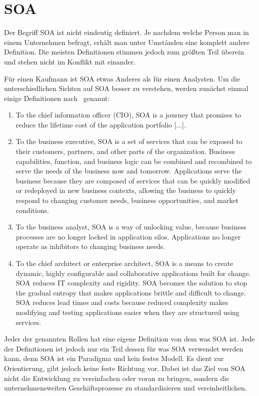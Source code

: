 \chapter{SOA}
\label{chap:soa}
Der Begriff SOA ist nicht eindeutig definiert. Je nachdem welche Person man in einem Unternehmen befragt, erhält man unter Umständen eine komplett andere Definition. \frqq Die meisten Definitionen stimmen jedoch zum größten Teil überein und stehen nicht im Konflikt mit einander.\flqq\cite[vgl. Seite 6]{100QA}

Für einen Kaufmann ist SOA etwas Anderes als für einen Analysten. Um die unterschiedlichen Sichten auf SOA besser zu verstehen, werden zunächst einmal einige Definitionen nach \cite{100QA}\ genannt:
\begin{enumerate}
       \item \frqq To the chief information officer (CIO), SOA is a journey that
       promises to reduce the lifetime cost of the application portfolio [...].\flqq \cite[vgl. Seite 6]{100QA}
    
       \item \frqq To the business executive, SOA is a set of services that can be exposed to their customers, partners, and other parts of the organization. Business capabilities, function, and business logic can be combined and recombined to serve the needs of the business now and tomorrow. Applications serve the business because they are composed
       of services that can be quickly modified or redeployed in new
       business contexts, allowing the business to quickly respond to changing
       customer needs, business opportunities, and market conditions.\flqq \cite[vgl. Seite 6]{100QA}
       
       \item \frqq To the business analyst, SOA is a way of unlocking value, because business processes are no longer locked in application silos. Applications no longer operate as inhibitors to changing business needs.\flqq \cite[vgl. Seite 6]{100QA}
       
       \item \frqq To the chief architect or enterprise architect, SOA is a means to
       create dynamic, highly configurable and collaborative applications
       built for change. SOA reduces IT complexity and rigidity. SOA becomes the solution to stop the gradual entropy that makes applications
       brittle and difficult to change. SOA reduces lead times and costs
       because reduced complexity makes modifying and testing applications
       easier when they are structured using services.\flqq \cite[vgl. Seite 6]{100QA}
\end{enumerate}
Jeder der genannten Rollen hat eine eigene Definition von dem was SOA ist. Jede der Definitionen ist jedoch nur ein Teil dessen für was SOA verwendet werden kann, denn SOA ist ein Paradigma und kein festes Modell. Es dient zur Orientierung, gibt jedoch keine feste Richtung vor. Dabei ist das Ziel von SOA nicht die Entwicklung zu vereinfachen oder voran zu bringen, sondern die unternehmensweiten Geschäftsprozesse zu standardisieren und vereinheitlichen.

